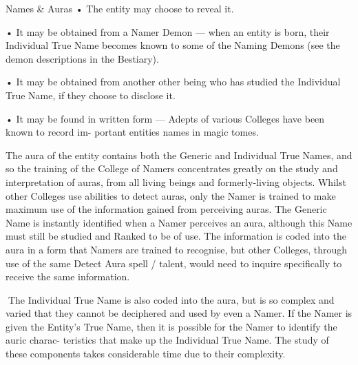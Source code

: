 \begin{Chapter}{Names \& Auras}
• The entity may choose to reveal it.  

•  It  may  be  obtained  from  a  Namer  Demon  — 
when an entity is born, their Individual True Name 
becomes  known  to  some  of  the  Naming  Demons 
(see the demon descriptions in the Bestiary).  

• It may be obtained from another other being who 
has  studied  the  Individual  True  Name,  if  they 
choose to disclose it.  

•  It  may  be  found  in  written  form  —  Adepts  of 
various  Colleges  have  been  known  to  record  im-
portant entities names in magic tomes. 

The  aura  of  the  entity  contains  both  the  Generic 
and  Individual  True  Names,  and  so the  training  of 
the  College  of  Namers  concentrates greatly  on  the 
study  and  interpretation  of  auras,  from  all  living 
beings  and  formerly-living  objects.  Whilst  other 
Colleges  use  abilities  to  detect  auras,  only  the 
Namer  is  trained  to  make  maximum  use  of  the 
information  gained  from  perceiving  auras.  The 
Generic Name is instantly identified when a Namer 
perceives an aura, although this Name must still be 
studied  and  Ranked  to  be  of  use.  The  information 
is  coded  into  the  aura  in  a  form  that  Namers  are 
trained  to  recognise,  but  other  Colleges,  through 
use  of  the  same  Detect  Aura  spell  /  talent,  would 
need  to  inquire  specifically  to  receive  the  same 
information. 

The  Individual  True  Name  is  also  coded  into  the 
aura, but is so complex and varied that they cannot 
be  deciphered  and  used  by  even  a  Namer.  If  the 
Namer  is  given  the  Entity’s  True  Name,  then  it  is 
possible for the Namer to identify the auric charac-
teristics  that  make  up  the  Individual  True  Name. 
The  study  of  these  components  takes  considerable 
time due to their complexity. 

\end{Chapter}
